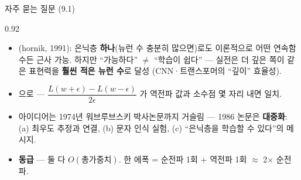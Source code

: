\begin{frame}{자주 묻는 질문 (9.1)}
\begin{center}\begin{varwidth}{0.92\textwidth}
  \small
  \begin{itemize}
    \item {}
      (hornik, 1991): 은닉층 \textbf{하나}(뉴런 수 충분히
      많으면)로도 이론적으로 어떤 연속함수든 근사 가능. 하지만
      ``가능하다'' $\neq$ ``학습이 쉽다'' — 실전은 더 깊은 쪽이
      같은 표현력을 \textbf{훨씬 적은 뉴런 수}로 달성 (CNN·트랜스포머의
      ``깊이'' 효율성).
    \item {}
      으로 — $\dfrac{L(w+\epsilon)-L(w-\epsilon)}{2\epsilon}$
      가 역전파 값과 소수점 몇 자리 내면 일치.
    \item {}
      아이디어는 1974년 워브루브스키 박사논문까지 거슬림 — 1986 논문은
      \textbf{대중화}: (a) 최우도 추정과 연결, (b) 문자 인식 실험,
      (c) ``은닉층을 학습할 수 있다''의 메시지.
    \item {}
      \textbf{동급} — 둘 다 $O(\text{총가중치})$.
      한 에폭 = 순전파 1회 + 역전파 1회 $\approx$ 2$\times$ 순전파.
  \end{itemize}
\end{varwidth}\end{center}
\end{frame}
